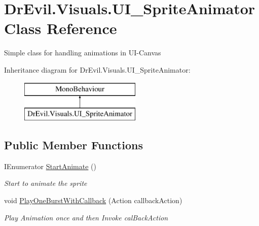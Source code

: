 \hypertarget{class_dr_evil_1_1_visuals_1_1_u_i___sprite_animator}{}\section{Dr\+Evil.\+Visuals.\+U\+I\+\_\+\+Sprite\+Animator Class Reference}
\label{class_dr_evil_1_1_visuals_1_1_u_i___sprite_animator}


Simple class for handling animations in U\+I-\/\+Canvas  


Inheritance diagram for Dr\+Evil.\+Visuals.\+U\+I\+\_\+\+Sprite\+Animator\+:\begin{figure}[H]
\begin{center}
\leavevmode
\includegraphics[height=2.000000cm]{class_dr_evil_1_1_visuals_1_1_u_i___sprite_animator}
\end{center}
\end{figure}
\subsection*{Public Member Functions}
\begin{DoxyCompactItemize}
\item 
I\+Enumerator \mbox{\hyperlink{class_dr_evil_1_1_visuals_1_1_u_i___sprite_animator_abe0f4c138486d258edf5c55c3ae5e797}{Start\+Animate}} ()
\begin{DoxyCompactList}\small\item\em Start to animate the sprite \end{DoxyCompactList}\item 
void \mbox{\hyperlink{class_dr_evil_1_1_visuals_1_1_u_i___sprite_animator_a5a8be113a9d81c7f98526d04bd7784ad}{Play\+One\+Burst\+With\+Callback}} (Action callback\+Action)
\begin{DoxyCompactList}\small\item\em Play Animation once and then Invoke cal\+Back\+Action \end{DoxyCompactList}\end{DoxyCompactItemize}
